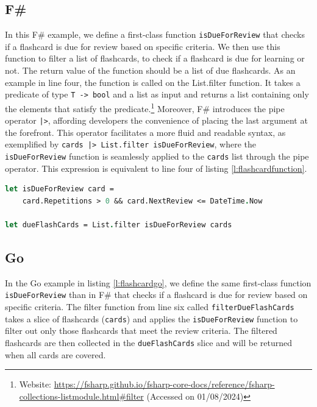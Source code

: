     \subsection*{F\#}
    In this F\# example, we define a first-class function \texttt{isDueForReview} that checks if a flashcard is due for review based on specific criteria. We then use this function to filter a list of flashcards, to check if a flashcard is due for learning or not. The return value of the function should be a list of due flashcards. As an example in line four, the function is called on the List.filter function. It takes a predicate of type \texttt{T -> bool} and a list as input and returns a list containing only the elements that satisfy the predicate.\footnote{Website: \url{https://fsharp.github.io/fsharp-core-docs/reference/fsharp-collections-listmodule.html\#filter} (Accessed on 01/08/2024)} Moreover, F\# introduces the pipe operator \texttt{|>}, affording developers the convenience of placing the last argument at the forefront. This operator facilitates a more fluid and readable syntax, as exemplified by \texttt{cards |> List.filter isDueForReview}, where the \texttt{isDueForReview} function is seamlessly applied to the \texttt{cards} list through the pipe operator. This expression is equivalent to line four of listing \ref{l:flashcardfunction}.

        \begin{lstlisting}[language=fsharp, firstnumber=1,float=tp, caption={First-class function reresentation in F\#}, label=l:flashcardfunction]
let isDueForReview card =
    card.Repetitions > 0 && card.NextReview <= DateTime.Now
        
let dueFlashCards = List.filter isDueForReview cards
        \end{lstlisting}
        
      
    \subsection*{Go}
    In the Go example in listing \ref{l:flashcardgo}, we define the same first-class function \texttt{isDueForReview} than in F\# that checks if a flashcard is due for review based on specific criteria. The filter function from line six called \texttt{filterDueFlashCards} takes a slice of flashcards (\texttt{cards}) and applies the \texttt{isDueForReview} function to filter out only those flashcards that meet the review criteria. The filtered flashcards are then collected in the \texttt{dueFlashCards} slice and will be returned when all cards are covered.
    
